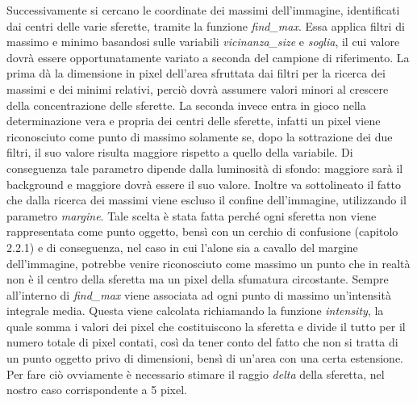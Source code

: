 Successivamente si cercano le coordinate dei massimi dell'immagine, identificati dai centri delle varie sferette, tramite la funzione \textit{find\_max}. 
Essa applica filtri di massimo e minimo basandosi sulle variabili \textit{vicinanza\_size} e \textit{soglia}, il cui valore dovrà essere opportunatamente variato a seconda del campione di riferimento. 
La prima dà la dimensione in pixel dell'area sfruttata dai filtri per la ricerca dei massimi e dei minimi relativi, perciò dovrà assumere valori minori al crescere della concentrazione delle sferette. 
La seconda invece entra in gioco nella determinazione vera e propria dei centri delle sferette, infatti un pixel viene riconosciuto come punto di massimo solamente se, dopo la sottrazione dei due filtri, il suo valore risulta maggiore rispetto a quello della variabile. 
Di conseguenza tale parametro dipende dalla luminosità di sfondo: maggiore sarà il background e maggiore dovrà essere il suo valore.
Inoltre va sottolineato il fatto che dalla ricerca dei massimi viene escluso il confine dell'immagine, utilizzando il parametro \textit{margine}. 
Tale scelta è stata fatta perché ogni sferetta non viene rappresentata come punto oggetto, bensì con un cerchio di confusione (capitolo 2.2.1) e di conseguenza, nel caso in cui l'alone sia a cavallo del margine dell'immagine, potrebbe venire riconosciuto come massimo un punto che in realtà non è il centro della sferetta ma un pixel della sfumatura circostante.
Sempre all'interno di \textit{find\_max} viene associata ad ogni punto di massimo un'intensità integrale media. 
Questa viene calcolata richiamando la funzione \textit{intensity}, la quale somma i valori dei pixel che costituiscono la sferetta e divide il tutto per il numero totale di pixel contati, così da tener conto del fatto che non si tratta di un punto oggetto privo di dimensioni, bensì di un'area con una certa estensione. 
Per fare ciò ovviamente è necessario stimare il raggio \textit{delta} della sferetta, nel nostro caso corrispondente a 5 pixel.

